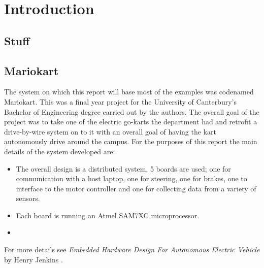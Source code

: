 \section{Introduction}

  \subsection{Stuff}
  \subsection{Mariokart}

    The system on which this report will base most of the examples was codenamed
    Mariokart.  This was a final year project for the University of Canterbury's
    Bachelor of Engineering degree carried out by the authors.  The overall goal
    of the project was to take one of the electric go-karts the department had
    and retrofit a drive-by-wire system on to it with an overall goal of having
    the kart autonomously drive around the campus.  For the purposes of this
    report the main details of the system developed are:

    \renewcommand{\labelitemi}{}
    \begin{itemize}
      \item 
        The overall design is a distributed system, 5 boards are used; one for
        communication with a host laptop, one for steering, one for brakes, one
        to interface to the motor controller and one for collecting data from a
        variety of sensors.

      \item
        Each board is running an Atmel SAM7XC microprocessor.

      \item
        
    \end{itemize}

    For more details see \emph{Embedded Hardware Design For Autonomous Electric
    Vehicle} by Henry Jenkins \cite{jenkins_2011}.
